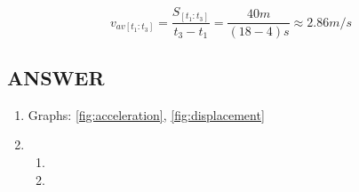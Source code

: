 \documentclass{article}
\begin{document}
$$ v_{av[t_1: t_3]} = \frac{S_{[t_1: t_3]}}{t_3 - t_1} = \frac{40m}{(18 - 4)s} \approx 2.86m/s $$


\vfill %

\subsection*{ANSWER}

\begin{enumerate}
    \item Graphs: \ref{fig:acceleration}, \ref{fig:displacement}
    \item \begin{enumerate}
        \item 
        \item 
    \end{enumerate}
\end{enumerate}
\end{document}

